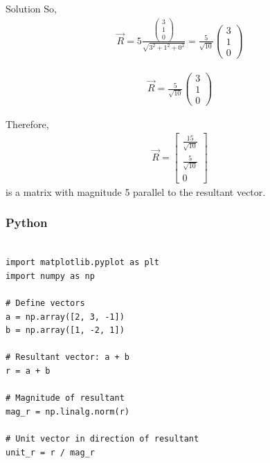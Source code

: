 \documentclass{beamer}
\begin{document}
\begin{frame}{Solution}
So,
\begin{align}
\vec{R} = 5 \frac{\begin{pmatrix} 3 \\ 1 \\ 0 \end{pmatrix}}{\sqrt{3^2 + 1^2 + 0^2}} = \frac{5}{\sqrt{10}} \begin{pmatrix} 3 \\ 1 \\ 0 \end{pmatrix}
\end{align}

\begin{align}
\boxed{
\vec{R} = \frac{5}{\sqrt{10}}
\begin{pmatrix}
3 \\
1 \\
0
\end{pmatrix}
}
\end{align}
    
Therefore,
\begin{align}
\vec{R} = \begin{bmatrix}
\frac{15}{\sqrt{10}} \\
\frac{5}{\sqrt{10}} \\
0
\end{bmatrix}
\end{align}
is a matrix with magnitude 5 parallel to the resultant vector.





\end{frame}


\begin{frame}[fragile]
    \frametitle{Python}
    \begin{lstlisting}

import matplotlib.pyplot as plt
import numpy as np

# Define vectors
a = np.array([2, 3, -1])
b = np.array([1, -2, 1])

# Resultant vector: a + b
r = a + b

# Magnitude of resultant
mag_r = np.linalg.norm(r)

# Unit vector in direction of resultant
unit_r = r / mag_r



\end{lstlisting}
\end{frame}
\end{document}

